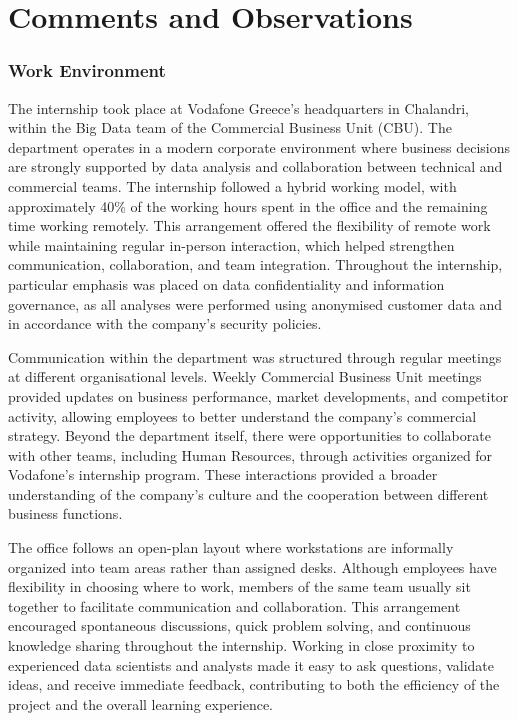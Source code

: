 \documentclass[12pt, a4paper, oneside]{report}
\begin{document}
\chapter{Comments and Observations}
\subsection{Work Environment}
The internship took place at Vodafone Greece's headquarters in Chalandri, within the Big Data team of the Commercial Business Unit (CBU). The department operates in a modern corporate environment where business decisions are strongly supported by data analysis and collaboration between technical and commercial teams. The internship followed a hybrid working model, with approximately 40\% of the working hours spent in the office and the remaining time working remotely. This arrangement offered the flexibility of remote work while maintaining regular in-person interaction, which helped strengthen communication, collaboration, and team integration. Throughout the internship, particular emphasis was placed on data confidentiality and information governance, as all analyses were performed using anonymised customer data and in accordance with the company's security policies.

Communication within the department was structured through regular meetings at different organisational levels. Weekly Commercial Business Unit meetings provided updates on business performance, market developments, and competitor activity, allowing employees to better understand the company's commercial strategy. Beyond the department itself, there were opportunities to collaborate with other teams, including Human Resources, through activities organized for Vodafone's internship program. These interactions provided a broader understanding of the company's culture and the cooperation between different business functions.

The office follows an open-plan layout where workstations are informally organized into team areas rather than assigned desks. Although employees have flexibility in choosing where to work, members of the same team usually sit together to facilitate communication and collaboration. This arrangement encouraged spontaneous discussions, quick problem solving, and continuous knowledge sharing throughout the internship. Working in close proximity to experienced data scientists and analysts made it easy to ask questions, validate ideas, and receive immediate feedback, contributing to both the efficiency of the project and the overall learning experience.
\end{document}
